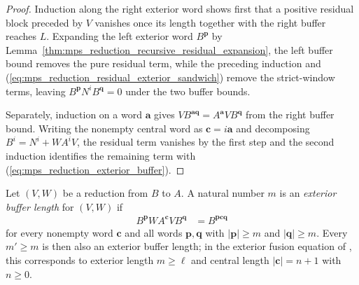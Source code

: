 \begin{proof}
    \leanok
    Induction along the right exterior word shows first that a positive
    residual block preceded by $V$ vanishes once its length together with the
    right buffer reaches $L$.  Expanding the left exterior word
    $B^{\mathbf p}$ by
    Lemma~\ref{thm:mps_reduction_recursive_residual_expansion}, the left
    buffer bound removes the pure residual term, while the preceding induction
    and (\ref{eq:mps_reduction_residual_exterior_sandwich}) remove the
    strict-window terms, leaving
    $B^{\mathbf p}N^iB^{\mathbf q}=0$ under the two buffer bounds.

    Separately, induction on a word $\mathbf a$ gives
    $VB^{\mathbf a\mathbf q}=A^{\mathbf a}VB^{\mathbf q}$ from the right
    buffer bound.  Writing the nonempty central word as
    $\mathbf c=i\mathbf a$ and decomposing $B^i=N^i+WA^iV$, the residual term
    vanishes by the first step and the second induction identifies the
    remaining term with (\ref{eq:mps_reduction_exterior_buffer}).
\end{proof}

\begin{definition}
    \label{def:mps_reduction_exterior_buffer_length}
    \leanok
    Let $(V,W)$ be a reduction from $B$ to $A$.  A natural number $m$ is an
    \emph{exterior buffer length} for $(V,W)$ if
    \begin{align}
        B^{\mathbf p}WA^{\mathbf c}VB^{\mathbf q}
         & =B^{\mathbf p\mathbf c\mathbf q}
        \label{eq:mps_reduction_exterior_buffer_length}
    \end{align}
    for every nonempty word $\mathbf c$ and all words $\mathbf p,\mathbf q$
    with $|\mathbf p|\geq m$ and $|\mathbf q|\geq m$.  Every $m'\geq m$ is
    then also an exterior buffer length; in the exterior fusion equation of
    \cite[lines~1409--1498]{FrancoRubio2025MPUGauging}, this corresponds to
    exterior length $m\geq\ell$ and central length $|\mathbf c|=n+1$ with
    $n\geq0$.
\end{definition}

